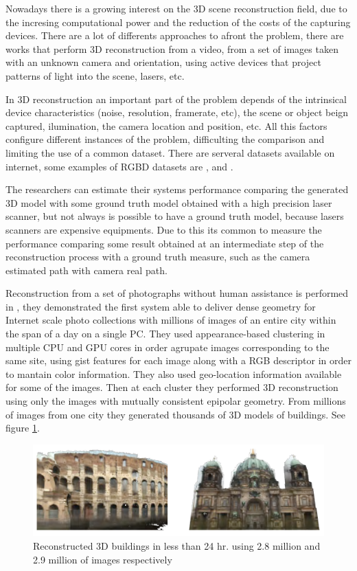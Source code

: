  
Nowadays there is a growing interest on the 3D scene reconstruction field, due to the incresing computational power and the reduction of 
the costs of the capturing devices. There are a lot of differents approaches to afront the problem, there are works that perform 3D reconstruction 
from a video, from a set of images taken with an unknown camera and orientation, using active devices that project patterns of light into 
the scene, lasers, etc. 

In 3D reconstruction an important part of the problem depends of the intrinsical 
device characteristics (noise, resolution, framerate, etc), the scene or object beign captured, ilumination, the camera location and position, etc. All this 
factors configure different instances of the problem, difficulting the comparison and limiting the use of a common dataset. There are serveral datasets 
available on internet, some examples of RGBD datasets are \cite{sturm12iros},  \cite{LaiBRF11} and \cite{ShottonGZICF13}.

The researchers can estimate their systems performance comparing the generated 3D model with some 
ground truth model obtained with a high precision laser scanner, but not always is possible to have a ground truth model, because lasers scanners 
are expensive equipments. Due to this its common to measure the performance
 comparing some result obtained at an intermediate step of the reconstruction process with a ground truth measure, 
such as the camera estimated path with camera real path.   

Reconstruction from a set of photographs without human assistance is performed in \cite{jan}, they demonstrated the first system able to deliver dense geometry for Internet scale photo collections with millions of images of an entire city within the span of a day on a single PC. They used appearance-based clustering in multiple CPU and GPU cores 
in order agrupate images corresponding to the same site, using gist features for each image along with a RGB
descriptor in order to mantain color information. They also used geo-location information available for some of 
the images. Then at each cluster they performed 3D reconstruction using only the images with mutually consistent epipolar 
geometry. From millions of images from one city they generated thousands of 3D models of buildings. See figure \ref{fig:jan}. 


\begin{figure}[h!]
\begin{center}
\includegraphics[scale=0.25]{images/jan}
\caption{Reconstructed 3D buildings in less than 24 hr. using 2.8 million and 2.9 million of images respectively}
\label{fig:jan}
\end{center}
\end{figure}

